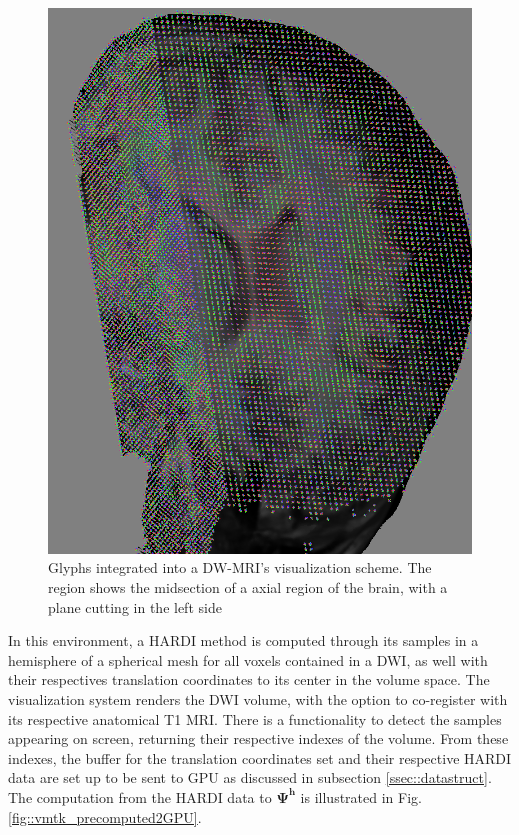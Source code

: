\documentclass[twoside,twocolumn,10pt]{article}
\begin{document}
\begin{figure}[h]
    \centering
    \includegraphics[width=1.00\linewidth, angle=0]{figs/Results/glyphs_integrated_DWI.png}
    \caption{Glyphs integrated into a DW-MRI's visualization scheme. The region shows the midsection of a axial region of the brain, with a plane cutting in the left side%
    }
    \label{fig::ex_glyph_DWI_visualization}
\end{figure}

In this environment, a HARDI method is computed through its samples in a hemisphere of a spherical mesh for all voxels contained in a DWI, as well with their respectives translation coordinates to its center in the volume space. The visualization system renders the DWI volume, with the option to co-register with its respective anatomical T1 MRI. There is a functionality to detect the samples appearing on screen, returning their respective indexes of the volume. From these indexes, the buffer for the translation coordinates set and their respective HARDI data are set up to be sent to GPU as discussed in subsection \ref{ssec::datastruct}. The computation from the HARDI data to $\bm{\Psi^h}$ is illustrated in Fig. \ref{fig::vmtk_precomputed2GPU}.
\end{document}
